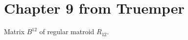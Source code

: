 \section{Chapter 9 from Truemper}

\begin{proposition}[9.2.14]
  \label{prop:9.2.14}
  Matrix $B^{12}$ of regular matroid $R_{12}$.
\end{proposition}

